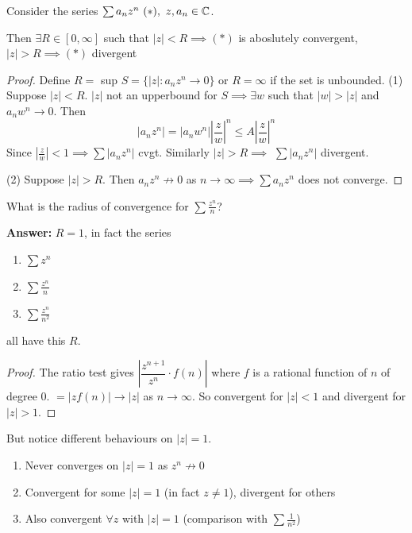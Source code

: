 \documentclass[10pt,twoside]{scrartcl}
\begin{document}
\vspace*{10pt}
\begin{theorem}
	Consider the series $\sum a_nz^n ~(*),~ z,a_n \in\mathbb{C}$. 
	
	Then $\exists R \in [0,\infty]$ such that $|z| < R \implies (*)$ is aboslutely convergent, $|z| > R \implies (*)$ divergent
\end{theorem}

\begin{proof}
Define $R =$ sup $S = \{|z| : a_nz^n \to 0\}$	 or $R = \infty$ if the set is unbounded. (1) Suppose $|z| < R$. $|z|$ not an upperbound for $S \implies \exists w$ such that $|w| > |z|$ and $a_nw^n \to 0.$ Then \[|a_nz^n| = |a_nw^n|\left|\frac{z}{w}\right|^n \leq A\left|\frac{z}{w}\right|^n\] Since $\left|\frac{z}{w}\right| < 1 \implies \sum|a_nz^n|$ cvgt. Similarly $|z| >R  \implies$ $\sum |a_nz^n|$ divergent. 

(2) Suppose $|z| > R$. Then $a_nz^n \not\to 0$ as $n \to \infty \implies \sum a_nz^n$ does not converge.
\end{proof}\vspace*{5pt}

\begin{clicker}
What is the radius of convergence for $\sum \frac{z^n}{n}$? 

\textbf{Answer:} $R = 1$, in fact the series
\begin{enumerate}
\item $\sum z^n$
\item $\sum \frac{z^n}{n}$
\item $\sum \frac{z^n}{n^2}$	
\end{enumerate}
all have this $R$.

\begin{proof}
The ratio test gives  $\left|\dfrac{z^{n+1}}{z^n}\cdot f(n)\right|$ where $f$ is a rational function of $n$ of degree $0$. $= |zf(n)| \to |z|$ as $n \to \infty$. So convergent for $|z| < 1$ and divergent for $|z| > 1$.  	
\end{proof}

But notice different behaviours on $|z| = 1$. \begin{enumerate}
 \item Never converges on $|z| = 1$ as $z^n \not\to 0$
 \item Convergent for some $|z| = 1$ (in fact $z \neq 1$), divergent for others
 \item Also convergent $\forall z$ with $|z|  =1$ (comparison with $\sum \frac{1}{n^2}$)	
 \end{enumerate}
\end{clicker}
\end{document}
